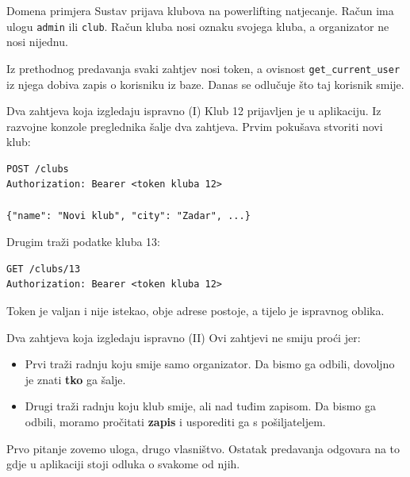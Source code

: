 \begin{frame}{Domena primjera}
Sustav prijava klubova na powerlifting natjecanje. Račun ima ulogu \texttt{admin} ili \texttt{club}. Račun kluba nosi oznaku svojega kluba, a organizator ne nosi nijednu.

\vspace{0.4em}
Iz prethodnog predavanja svaki zahtjev nosi token, a ovisnost \texttt{get\_current\_user} iz njega dobiva zapis o korisniku iz baze. Danas se odlučuje što taj korisnik smije.
\end{frame}

\begin{frame}[fragile]{Dva zahtjeva koja izgledaju ispravno (I)}
Klub 12 prijavljen je u aplikaciju. Iz razvojne konzole preglednika šalje dva zahtjeva. Prvim pokušava stvoriti novi klub:

\begin{lstlisting}
POST /clubs
Authorization: Bearer <token kluba 12>

{"name": "Novi klub", "city": "Zadar", ...}
\end{lstlisting}

\vspace{0.4em}
Drugim traži podatke kluba 13:

\begin{lstlisting}
GET /clubs/13
Authorization: Bearer <token kluba 12>
\end{lstlisting}

\vspace{0.4em}
Token je valjan i nije istekao, obje adrese postoje, a tijelo je ispravnog oblika.
\end{frame}

\begin{frame}{Dva zahtjeva koja izgledaju ispravno (II)}
Ovi zahtjevi ne smiju proći jer:

\vspace{0.9em}
\begin{itemize}
  \itemsep0.6em
  \item Prvi traži radnju koju smije samo organizator. Da bismo ga odbili, dovoljno je znati \textbf{tko} ga šalje.
  \item Drugi traži radnju koju klub smije, ali nad tuđim zapisom. Da bismo ga odbili, moramo pročitati \textbf{zapis} i usporediti ga s pošiljateljem.
\end{itemize}

\vspace{1.1em}
Prvo pitanje zovemo uloga, drugo vlasništvo. Ostatak predavanja odgovara na to gdje u aplikaciji stoji odluka o svakome od njih.
\end{frame}

